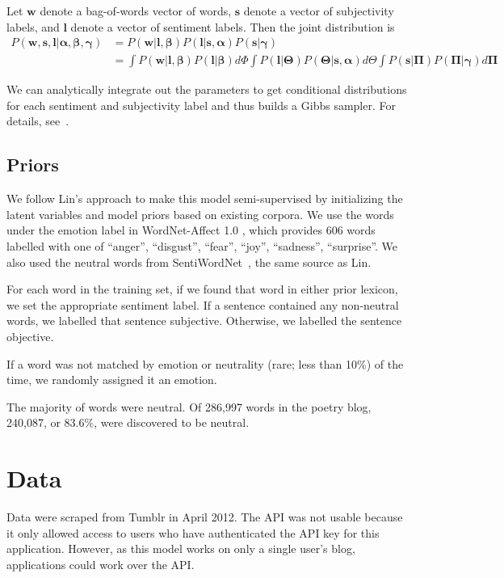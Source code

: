 \documentclass{article}
\begin{document}
Let $\mathbf{w}$ denote a bag-of-words vector of words, $\mathbf{s}$
denote a vector of subjectivity labels, and $\mathbf{l}$ denote a vector
of sentiment labels. Then the joint distribution is
\begin{align}
P(\mathbf{w,s,l}|\mathbf{\alpha,\beta,\gamma}) &= P(\mathbf{w}|\mathbf{l,\beta})P(\mathbf{l}|\mathbf{s,\alpha})P(\mathbf{s}|\mathbf{\gamma}) \\
    &= \int P(\mathbf{w}|\mathbf{l,\beta})P(\mathbf{l}|\mathbf{\beta}) d\Phi \int P(\mathbf{l}|\mathbf{\Theta})P(\mathbf{\Theta}|\mathbf{s,\alpha})d\Theta \int P(\mathbf{s}|\mathbf{\Pi})P(\mathbf{\Pi}|\mathbf{\gamma}) d\mathbf{\Pi}
\end{align}

We can analytically integrate out the parameters to get conditional
distributions for each sentiment and subjectivity label and thus
builds a Gibbs sampler. For details, see~\citep{lin03}.

\subsection{Priors}
We follow Lin's approach to make this model semi-supervised by
initializing the latent variables and model priors based on existing
corpora. We use the words under the {\sc emotion} label in WordNet-Affect
1.0 \citep{strapparava04}, which provides 606 words labelled with
one of ``anger'', ``disgust'', ``fear'', ``joy'', ``sadness'',
``surprise''. We also used the neutral words from
SentiWordNet~\citep{baccianella10}, the same source as Lin.

For each word in the training set, if we found that word in either
prior lexicon, we set the appropriate sentiment label. If a sentence
contained any non-neutral words, we labelled that sentence subjective.
Otherwise, we labelled the sentence objective.

If a word was not matched by emotion or neutrality (rare; less than
10\%) of the time, we randomly assigned it an emotion.

The majority of words were neutral. Of 286,997 words in the 
poetry blog, 240,087, or 83.6\%, were discovered to be neutral.

\section{Data}
Data were scraped from Tumblr in April 2012. The API
was not usable because it only allowed access to users who have
authenticated the API key for this application. However, as this
model works on only a single user's blog, applications could work
over the API.
\end{document}
